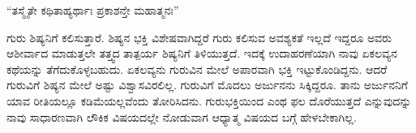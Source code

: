 \begin{shloka}
``ತಸ್ಮೈತೇ ಕಥಿತಾಹ್ಯರ್ಥಾಃ ಪ್ರಕಾಶನ್ತೇ ಮಹಾತ್ಮನಃ''
\end{shloka}

ಗುರು ಶಿಷ್ಯನಿಗೆ ಕಲಿಸುತ್ತಾರೆ. ಶಿಷ್ಯನ ಭಕ್ತಿ ವಿಶೇಷವಾಗಿದ್ದರೆ ಗುರು ಕಲಿಸುವ ಅವಶ್ಯಕತೆ ಇಲ್ಲದೆ ಇದ್ದರೂ ಅವರು ಆಶೀರ್ವಾದ ಮಾಡುತ್ತಲೇ ತತ್ತ್ವದ ತಾತ್ಪರ್ಯ ಶಿಷ್ಯನಿಗೆ ತಿಳಿಯುತ್ತದೆ. ಇದಕ್ಕೆ ಉದಾಹರಣೆಯಾಗಿ ನಾವು ಏಕಲವ್ಯನ ಕಥೆಯನ್ನು ತೆಗೆದುಕೊಳ್ಳಬಹುದು. ಏಕಲವ್ಯನು ಗುರುವಿನ ಮೇಲೆ ಅಪಾರವಾಗಿ ಭಕ್ತಿ ಇಟ್ಟುಕೊಂಡಿದ್ದನು. ಆದರೆ ಗುರುವಿಗೆ ಶಿಷ್ಯನ ಮೇಲೆ ಅಷ್ಟು ವಿಶ್ವಾಸವಿರಲಿಲ್ಲ. ಗುರುವಿಗೆ ಮೊದಲು ಅರ್ಜುನನು ಸಿಕ್ಕಿದ್ದರೂ. ತಾನು ಅರ್ಜುನನಿಗೆ ಯಾವ ರೀತಿಯಲ್ಲೂ ಕಡಿಮೆಯಲ್ಲವೆಂದು ತೋರಿಸಿದನು. ಗುರುಭಕ್ತಿಯಿಂದ ಎಂಥ ಫಲ ದೊರೆಯುತ್ತದೆ ಎನ್ನುವುದನ್ನು ನಾವು ಸಾಧಾರಣವಾಗಿ ಲೌಕಿಕ ವಿಷಯದಲ್ಲೇ ನೋಡುವಾಗ ಆಧ್ಯಾತ್ಮ ವಿಷಯದ ಬಗ್ಗೆ ಹೇಳಬೇಕಾಗಿಲ್ಲ.


\begin{shloka}
\end{shloka}














